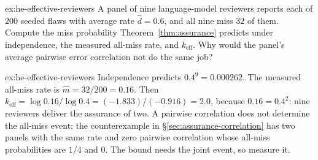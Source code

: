 \begin{pdexercise}[kind=Trace,rating=2]{ex:he-effective-reviewers}
A panel of nine language-model reviewers reports each of $200$ seeded flaws with average rate $\hat d=0.6$, and all nine miss $32$ of them. Compute the miss probability Theorem~\ref{thm:assurance} predicts under independence, the measured all-miss rate, and $k_{\mathrm{eff}}$. Why would the panel's average pairwise error correlation not do the same job?
\end{pdexercise}
\begin{pdsolution}{ex:he-effective-reviewers}
Independence predicts $0.4^9=0.000262$. The measured all-miss rate is $\hat m=32/200=0.16$. Then $k_{\mathrm{eff}}=\log0.16/\log0.4=(-1.833)/(-0.916)=2.0$, because $0.16=0.4^2$: nine reviewers deliver the assurance of two. A pairwise correlation does not determine the all-miss event: the counterexample in \S\ref{sec:assurance-correlation} has two panels with the same rate and zero pairwise correlation whose all-miss probabilities are $1/4$ and $0$. The bound needs the joint event, so measure it.
\end{pdsolution}
